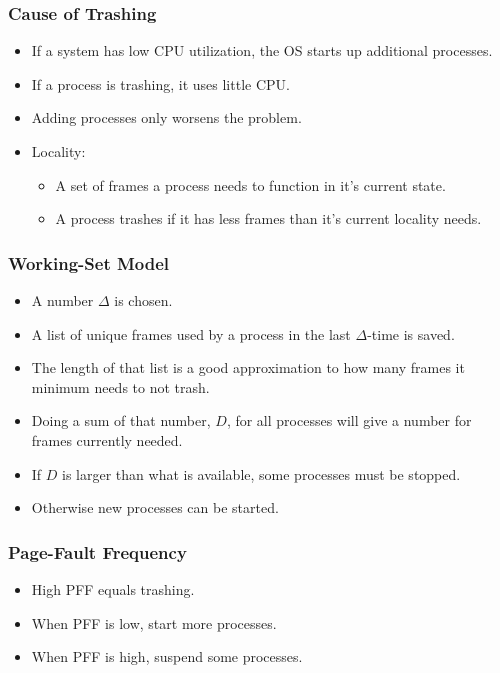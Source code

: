 \documentclass[a4wide,10pt]{article}
\begin{document}
	\subsubsection{Cause of Trashing} %
	\label{ssub:cause_of_trashing}
	\begin{itemize}
		\item If a system has low CPU utilization, the OS starts up additional processes.
		\item If a process is trashing, it uses little CPU.
		\item Adding processes only worsens the problem.
		\item Locality:
		\begin{itemize}
			\item A set of frames a process needs to function in it's current state.
			\item A process trashes if it has less frames than it's current locality needs.
		\end{itemize}
	\end{itemize}
	
	\subsubsection{Working-Set Model} %
	\label{ssub:working_set_model}
	\begin{itemize}
		\item A number $\Delta$ is chosen.
		\item A list of unique frames used by a process in the last $\Delta$-time is saved.
		\item The length of that list is a good approximation to how many frames it minimum needs to not trash.
		\item Doing a sum of that number, $D$, for all processes will give a number for frames currently needed.
		\item If $D$ is larger than what is available, some processes must be stopped.
		\item Otherwise new processes can be started.
	\end{itemize}
	
	\subsubsection{Page-Fault Frequency} %
	\label{ssub:page_fault_frequency}
	\begin{itemize}
		\item High PFF equals trashing.
		\item When PFF is low, start more processes.
		\item When PFF is high, suspend some processes.
	\end{itemize}
\end{document}
